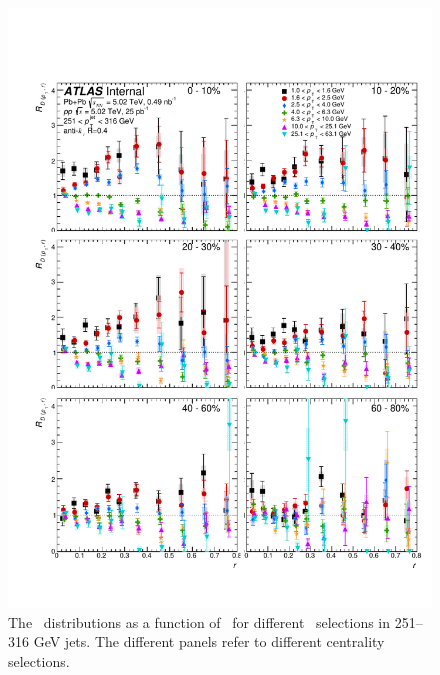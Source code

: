 \begin{figure}[h]
\includegraphics[width=1.0\textwidth]{figures/results/RDpT_dR_jet10.pdf}
\caption{The \RDptr\ distributions as a function of \rvar\ for different \pt\ selections in 251--316 GeV jets. The different panels refer to different centrality selections.}
\label{fig:fullset_drtr_j10}
\end{figure}
